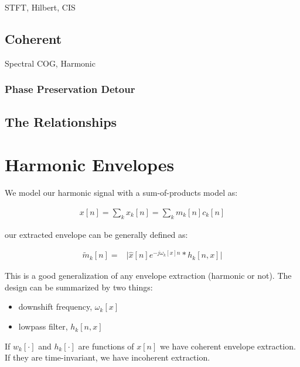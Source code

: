 \documentclass [11pt, proquest] {uwthesis}[2015/03/03]
\begin{document}
STFT, Hilbert, CIS

\section{Coherent}

Spectral COG, Harmonic

\subsection{Phase Preservation Detour}

\section{The Relationships}



\chapter{Harmonic Envelopes}

We model our harmonic signal with a sum-of-products model as:

\begin{align}
\label{eq:sum_of_products}
x[n] = \sum\limits_k x_k[n] = \sum\limits_k m_k[n] c_k[n]
\end{align}

our extracted envelope can be generally defined as:

\begin{align}
\label{eq:envelope_extraction}
\tilde{m}_k[n] =& \Big| \widehat{x}[n]e^{-j \omega_k[x]n} * h_k[n,x]  \Big|
\end{align}

This is a good generalization of any envelope extraction (harmonic or not). The design can be summarized by two things:

\begin{itemize}
\item downshift frequency, $\omega_k[x]$
\item lowpass filter, $h_k[n,x]$
\end{itemize}

If $w_k[\cdot]$ and $h_k[\cdot]$ are functions of $x[n]$ we have coherent envelope extraction.  If they are time-invariant, we have incoherent extraction.
\end{document}
